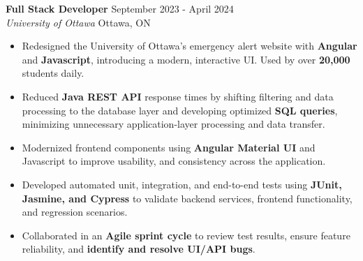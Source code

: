 \documentclass[a4paper]{article}
\begin{document}
\textbf{Full Stack Developer} \hfill September 2023 - April 2024\\
\textit{University of Ottawa} \hfill Ottawa, ON\\

\vspace{-2mm}

\begin{itemize} \itemsep -2pt

    
    \item Redesigned the University of Ottawa's emergency alert website with \textbf{Angular} and \textbf{Javascript}, introducing a modern, interactive UI. Used by over \textbf{20,000} students daily.

    \item Reduced \textbf{Java REST API} response times by shifting filtering and data processing to the database layer and developing optimized \textbf{SQL queries}, minimizing unnecessary application-layer processing and data transfer.

    \item Modernized frontend components using \textbf{Angular Material UI} and Javascript to improve usability, and consistency across the application.

    \item Developed automated unit, integration, and end-to-end tests using \textbf{JUnit, Jasmine, and Cypress} to validate backend services, frontend functionality, and regression scenarios.

    \item Collaborated in an \textbf{Agile sprint cycle} to review test results, ensure feature reliability, and \textbf{identify and resolve UI/API bugs}.

\end{itemize}
\end{document}
